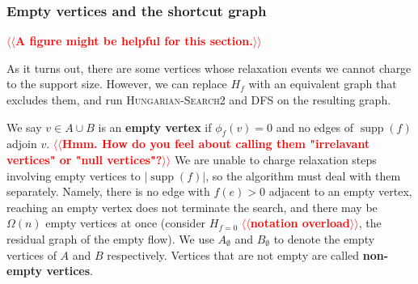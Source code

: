 \documentclass[11pt]{article}
\makeatletter
\def\fsupply{\phi}
\def\supp{\operatorname{supp}}
\theoremstyle{plain}
\newtheorem{corollary}[lemma]{Corollary}
\numberwithin{figure}{section}
\def\EMPH#1{\textbf{\boldmath #1}}
\def\n@te#1{\textsf{\boldmath \textbf{$\langle\!\langle$#1$\rangle\!\rangle$}}\leavevmode}
\def\note#1{\textcolor{red}{\n@te{#1}}}
\makeatother
\begin{document}
%
%
%
%
%

\subsubsection{Empty vertices and the shortcut graph}

\note{A figure might be helpful for this section.}

As it turns out, there are some vertices whose relaxation events we cannot
charge to the support size.
However, we can replace $H_f$ with an equivalent graph that excludes them,
and run \textsc{Hungarian-Search2} and \textsc{DFS} on the resulting graph.

We say $v \in A \cup B$ is an \EMPH{empty vertex} if $\fsupply_f(v) = 0$ and no edges
of $\supp(f)$ adjoin $v$.
\note{Hmm. How do you feel about calling them "irrelavant vertices" or "null vertices"?}
We are unable to charge relaxation steps involving empty vertices to
$|\supp(f)|$, so the algorithm must deal with them separately.
Namely, there is no edge with $f(e) > 0$ adjacent to an empty vertex,
reaching an empty vertex does not terminate the search, and there may be
$\Omega(n)$ empty vertices at once (consider $H_{f = 0}$ \note{notation overload}, the residual graph
of the empty flow).
We use $A_\emptyset$ and $B_\emptyset$ to denote the empty vertices of $A$ and
$B$ respectively.
Vertices that are not empty are called \EMPH{non-empty vertices}.
\end{document}
